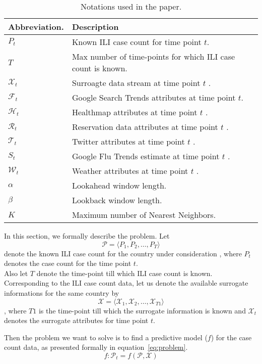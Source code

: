 
\begin{table*}[t!]
  \centering
  \begin{tabular}{|*{2}{l|}}
    \hline
    Abbreviation. & Description \\
    \hline \hline
    ${P}_t        $ & Known ILI case count for time point $t$.\\
        $T        $ & Max number of time-points for which ILI case count is known.\\
    $\mathcal{X}_t$ & Surroagte data stream at time point $t$ .\\
    $\mathcal{F}_t$ & Google Search Trends attributes at time point $t$.\\
    $\mathcal{H}_t$ & Healthmap attributes at time point $t$ .\\
    $\mathcal{R}_t$ & Reservation data attributes at time point $t$ .\\
    $\mathcal{T}_t$ & Twitter attributes at time point $t$ .\\
        ${S}_t    $ & Google Flu Trends estimate at time point $t$ .\\
    $\mathcal{W}_t$ & Weather attributes at time point $t$ .\\
    $\alpha$ & Lookahead window length.\\
    $\beta$ & Lookback window length.\\
        $K$ & Maximum number of Nearest Neighbors.\\
    \hline
  \end{tabular}
  \caption{\label{tb:notations} Notations used in the paper.
  }
\end{table*}

In this section, we formally describe the problem.
Let 
\[\mathcal{P} = \langle {P}_1, {P}_2, \dots,{P}_T \rangle\]
denote the known ILI case count for the country under
consideration , where ${P}_t$  denotes the case count for
the time point $t$.\\
Also let $T$ denote the time-point till which ILI case count is known.
\\
Corresponding to the ILI case count data, let us denote the available surrogate informations
for the same country by 
\[\mathcal{X} = \langle \mathcal{X}_1, \mathcal{X}_2, \dots, \mathcal{X}_{T1}\rangle\]
, where $T1$ is the time-point till which the surrogate
information is known and $\mathcal{X}_{t}$ denotes the surrogate attributes for time
point $t$. 

Then the problem we want to solve is to find a predictive model ($f$)  for the 
case count data, as presented formally in equation~\ref{eq:problem}.
\begin{equation}
  \label{eq:problem}
  f: \mathcal{P}_t = f\left(\mathcal{P}, \mathcal{X}\right)
\end{equation}


